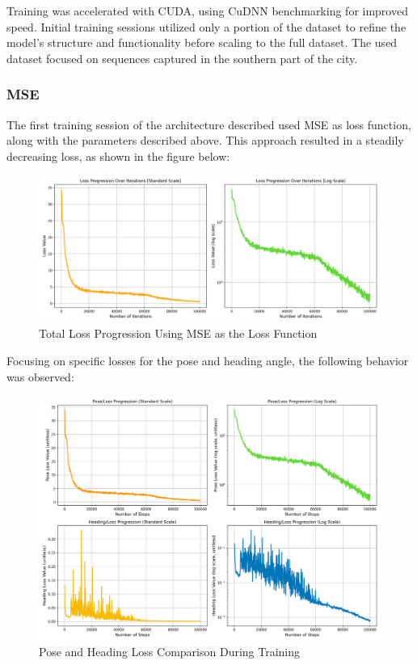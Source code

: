 Training was accelerated with CUDA, using CuDNN benchmarking for improved speed. Initial training sessions utilized only a portion of the dataset to refine the model’s structure and functionality before scaling to the full dataset. The used dataset focused on sequences captured in the southern part of the city. 

\subsubsection*{MSE}
The first training session of the architecture described used MSE as loss function, along with the parameters described above. This approach resulted in a steadily decreasing loss, as shown in the figure below:
\begin{figure}[H]
    \centering
    \includegraphics[width=1\linewidth]{LateX//figs/loss_total_mse_progression_comparison.png}
    \caption{Total Loss Progression Using MSE as the Loss Function}
    \label{fig:mse-loss-progression}
\end{figure}

Focusing on specific losses for the pose and heading angle, the following behavior was observed:
\begin{figure}[H]
    \centering
    \includegraphics[width=1\linewidth]{LateX//figs/mse_pose_heading_loss_comparison.png}
    \caption{Pose and Heading Loss Comparison During Training}
    \label{fig:pose-heading-loss}
\end{figure}

